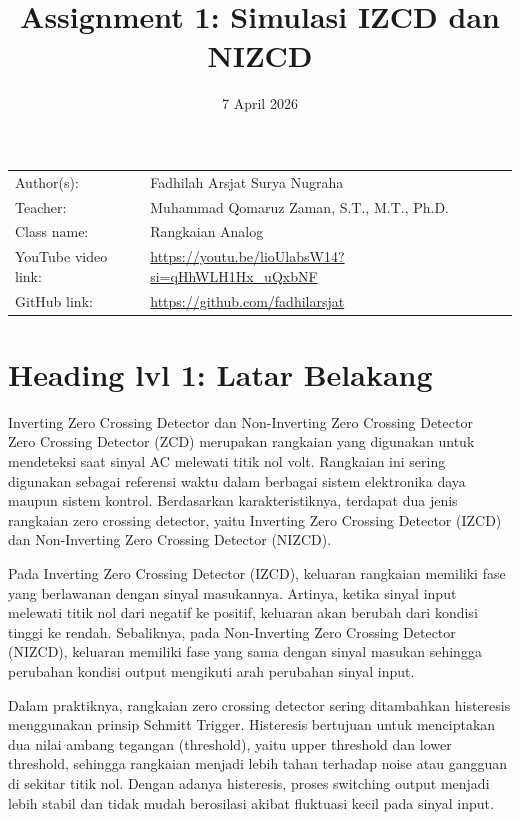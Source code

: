 \documentclass{article}
\title{Assignment 1: Simulasi IZCD dan NIZCD
}
\date{7 April 2026}
\begin{document}
\maketitle


\noindent\begin{tabular}{@{}ll}
    Author(s): & Fadhilah Arsjat Surya Nugraha\\
     Teacher: &  Muhammad Qomaruz Zaman, S.T., M.T., Ph.D.\\
     Class name: & Rangkaian Analog\\
     YouTube video link: & \url{https://youtu.be/lioUlabsW14?si=qHhWLH1Hx_uQxbNF} \\
     GitHub link: & \url{https://github.com/fadhilarsjat}
\end{tabular}
\vspace{2cm}

\section*{Heading lvl 1: Latar Belakang}

Inverting Zero Crossing Detector dan Non-Inverting Zero Crossing Detector\\ 

Zero Crossing Detector (ZCD) merupakan rangkaian yang digunakan untuk mendeteksi saat sinyal AC melewati titik nol volt. Rangkaian ini sering digunakan sebagai referensi waktu dalam berbagai sistem elektronika daya maupun sistem kontrol. Berdasarkan karakteristiknya, terdapat dua jenis rangkaian zero crossing detector, yaitu Inverting Zero Crossing Detector (IZCD) dan Non-Inverting Zero Crossing Detector (NIZCD).

Pada Inverting Zero Crossing Detector (IZCD), keluaran rangkaian memiliki fase yang berlawanan dengan sinyal masukannya. Artinya, ketika sinyal input melewati titik nol dari negatif ke positif, keluaran akan berubah dari kondisi tinggi ke rendah. Sebaliknya, pada Non-Inverting Zero Crossing Detector (NIZCD), keluaran memiliki fase yang sama dengan sinyal masukan sehingga perubahan kondisi output mengikuti arah perubahan sinyal input.

Dalam praktiknya, rangkaian zero crossing detector sering ditambahkan histeresis menggunakan prinsip Schmitt Trigger. Histeresis bertujuan untuk menciptakan dua nilai ambang tegangan (threshold), yaitu upper threshold dan lower threshold, sehingga rangkaian menjadi lebih tahan terhadap noise atau gangguan di sekitar titik nol. Dengan adanya histeresis, proses switching output menjadi lebih stabil dan tidak mudah berosilasi akibat fluktuasi kecil pada sinyal input.
\end{document}
